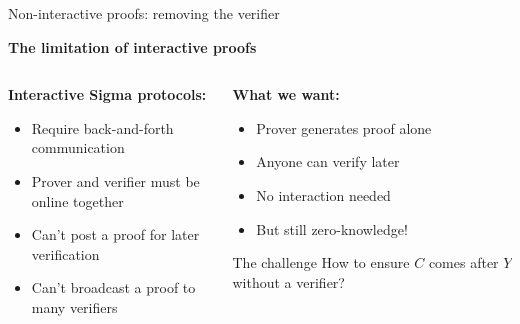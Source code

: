 \documentclass[aspectratio=169, lualatex, handout]{beamer}
\begin{document}
\begin{frame}{Non-interactive proofs: removing the verifier}
	\begin{center}
		\textbf{The limitation of interactive proofs}
	\end{center}
	\vspace{0.5em}
	\begin{columns}[c]
		\begin{column}{0.5\textwidth}
			\textbf{Interactive Sigma protocols:}
			\begin{itemize}
				\item Require back-and-forth communication
				\item Prover and verifier must be online together
				\item Can't post a proof for later verification
				\item Can't broadcast a proof to many verifiers
			\end{itemize}
		\end{column}
		\begin{column}{0.5\textwidth}
			\textbf{What we want:}
			\begin{itemize}
				\item Prover generates proof alone
				\item Anyone can verify later
				\item No interaction needed
				\item But still zero-knowledge!
			\end{itemize}
			\vspace{0.5em}
			\begin{alertblock}{The challenge}
				How to ensure $C$ comes after $Y$ without a verifier?
			\end{alertblock}
		\end{column}
	\end{columns}
\end{frame}
\end{document}
